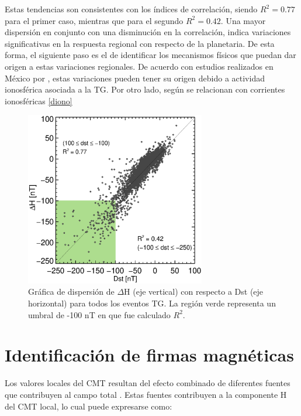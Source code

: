 Estas tendencias son consistentes con los índices de correlación, siendo $R^2=0.77$ para el primer caso, mientras que para el segundo $R^2=0.42$. Una mayor dispersión en conjunto con una disminución en la correlación, indica variaciones significativas en la respuesta regional con respecto de la planetaria. De esta forma, el siguiente paso es el de identificar los mecanismos físicos que puedan dar origen a estas variaciones regionales. De acuerdo con estudios realizados en México por \cite{dramaria_1, dramaria7, P-corona1, P-corona2}, estas variaciones pueden tener su origen debido a actividad ionosférica asociada a la TG. Por otro lado, según \cite{ddyn2005, angeoddyn, amorymazaudier_2017, amory2020_filtros} se relacionan con corrientes ionosféricas \ref{diono}

\begin{figure}
    \centering
     \includegraphics[width=0.7\textwidth]{Images/dispersion_general_dst.eps}
      \caption{Gráfica de dispersión de $\Delta$H (eje vertical) con respecto a Dst (eje horizontal) para todos los eventos TG. La región verde representa un umbral de -100 nT en que fue calculado $R^2$.}
       \label{fig:disp}
\end{figure}


\section{Identificación de firmas magnéticas}

Los valores locales del CMT resultan del efecto combinado de diferentes fuentes que contribuyen al campo total \parencite{iaga_guide, 1969intro_to_iono_p, l_handbook_geof_sw_Geom_field, baseline_Gjerloev, vanKampt}. Estas fuentes contribuyen a la componente H del CMT local, lo cual puede expresarse como:

